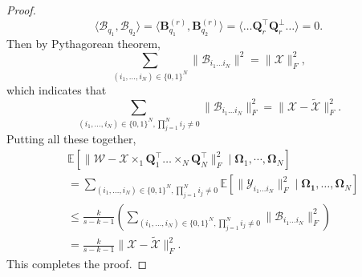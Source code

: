 \begin{proof}
\begin{equation}
\langle \mathscr{B}_{q_1}, \mathscr{B}_{q_2}\rangle = \langle  \mathbf{B}^{(r)}_{q_1}, \mathbf{B}^{(r)}_{q_2} \rangle = \langle \dots \mathbf{Q}_r^\top \mathbf{Q}_r^\bot \dots\rangle  = 0. 
\end{equation}
Then by Pythagorean theorem, 
\begin{equation}
\sum_{(i_1,\dots, i_N) \in \{0,1\}^N} \|\mathscr{B}_{i_1\dots i_N}\|^2 = \|\mathscr{X} \|_F^2, 
\end{equation}
which indicates that 
\begin{equation}
\sum_{(i_1,\dots, i_N) \in \{0,1\}^N, \prod_{j=1}^N i_j \neq 0} \|\mathscr{B}_{i_1\dots i_N}\|_F^2 = \|\mathscr{X} - \tilde{\mathscr{X}}\|_F^2. 
\end{equation}
Putting all these together, 
\begin{equation}
\begin{aligned}
&\mathbb{E}\left[ \|\mathscr{W} - \mathscr{X}\times_1 \mathbf{Q}_1^\top \dots \times_N \mathbf{Q}_N^\top\|_F^2 \mid \mathbf{\Omega}_1, \cdots, \mathbf{\Omega}_N \right] \\
& = \sum_{(i_1,\dots, i_N) \in \{0,1\}^N, \prod_{j=1}^N i_j \neq 0} \mathbb{E} \left[\|\mathscr{Y}_{i_1\dots i_N}\|_F^2 \mid \mathbf{\Omega_1}, \dots, \mathbf{\Omega}_N\right]\\
&\le \frac{k}{s-k-1} \left(\sum_{(i_1,\dots, i_N) \in \{0,1\}^N, \prod_{j=1}^N i_j \neq 0} \|\mathscr{B}_{i_1\dots i_N}\|_F^2 \right)\\
&= \frac{k}{s-k-1} \|\mathscr{X} - \tilde{\mathscr{X}}\|_F^2. 
\end{aligned}
\end{equation}
This completes the proof. 
\end{proof}


\iffalse
